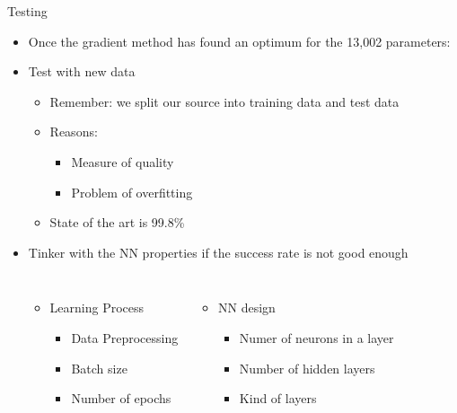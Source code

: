 \begin{frame}{Testing}
%
\begin{itemize}
\item Once the gradient method has found an optimum for the 13,002 parameters:
\item Test with new data
	\begin{itemize}
	\item Remember: we split our source into training data and test data
	\item Reasons:
		\begin{itemize}
		\item Measure of quality
		\item Problem of overfitting
		\end{itemize}
	\item State of the art is 99.8\%
	\end{itemize}
\item Tinker with the NN properties if the success rate is not good enough
	\vspace{-6pt}
	\begin{columns}[T]
		\begin{itemize}
		\item Learning Process
			\begin{itemize}
			\item Data Preprocessing
			\item Batch size
			\item Number of epochs
			\end{itemize}
		\end{itemize}
		\begin{itemize}
		\item NN design
			\begin{itemize}
			\item Numer of neurons in a layer
			\item Number of hidden layers
			\item Kind of layers
			\end{itemize}
		\end{itemize}
	\end{columns}
	
\end{itemize}
%
\end{frame}


